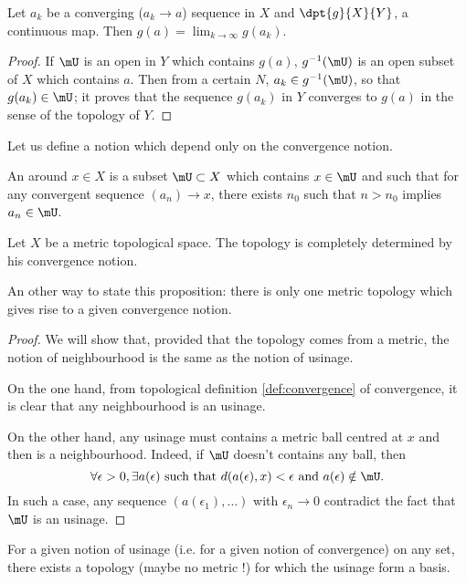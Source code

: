 \begin{proposition}
Let $a_k$ be a converging ($a_k\to a$) sequence in $X$ and $\dpt{g}{X}{Y}$, a continuous map. Then $g(a)=\lim_{k\to\infty}g(a_k)$.
\label{prop:continu_cv}
\end{proposition}
\begin{proof}
If $\mU$ is an open in $Y$ which contains $g(a)$, $g^{-1}(\mU)$ is an open subset of $X$ which contains $a$. Then from a certain $N$, $a_k\in g^{-1}(\mU)$, so that $g(a_k)\in\mU$; it proves that the sequence $g(a_k)$ in $Y$ converges to $g(a)$ in the sense of the topology of $Y$.
\end{proof}

Let us define a notion which depend only on the convergence notion. 

\begin{definition}
An  around $x\in X$ is a subset $\mU\subset X$ which contains $x\in\mU$ and such that for any convergent sequence $(a_n)\to x$, there exists $n_0$ such that $n>n_0$ implies $a_n\in\mU$.
\end{definition}

\begin{lemma}
Let $X$ be a metric topological space. The topology is completely determined by his convergence notion.

An other way to state this proposition: there is only one metric topology which gives rise to a given convergence notion. \label{prop:usinage}
\end{lemma}
\begin{proof}
We will show that, provided that the topology comes from a metric, the notion of neighbourhood is the same as the notion of usinage.

On the one hand, from topological definition \ref{def:convergence} of convergence, it is clear that any neighbourhood is an usinage.

On the other hand, any usinage must contains a metric ball centred at $x$ and then is a neighbourhood. Indeed, if $\mU$ doesn't contains any ball, then
\[
 \forall\epsilon>0,\exists a(\epsilon)\text{ such that } d(a(\epsilon),x)<\epsilon \text{ and } a(\epsilon)\notin\mU.
\]
%
In such a case, any sequence $( a(\epsilon_1),\ldots )$ with $\epsilon_n\to 0$ contradict the fact that $\mU$ is an usinage.
\end{proof}

\begin{proposition}
For a given notion of usinage (i.e. for a given notion of convergence) on any set, there exists a topology (maybe no metric !) for which the usinage form a basis.
\end{proposition}

